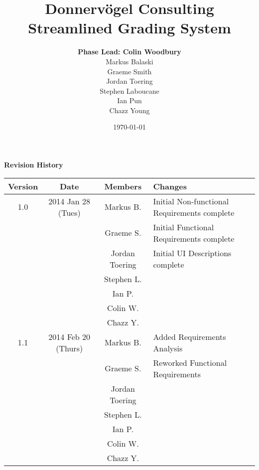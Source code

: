\documentclass{article}
\begin{document}
\title{Donnervögel Consulting \\ Streamlined Grading System}
\author{\textbf{Phase Lead: Colin Woodbury} \\ Markus Balaski \\ Graeme Smith \\ Jordan Toering 
			\\ Stephen Laboucane \\ Ian Pun \\ Chazz Young}
\date{\today}
\maketitle
\clearpage

\textbf{Revision History}
\begin{center}
  \begin{tabular}{| c | c | c | l |}
    \hline
    Version & Date & Members & Changes\\
    \hline
    1.0 & 2014 Jan 28 (Tues) & Markus B. & Initial Non-functional Requirements complete\\
    & & Graeme S. & Initial Functional Requirements complete\\
    & & Jordan Toering & Initial UI Descriptions complete\\
    & & Stephen L. & \\
    & & Ian P. & \\
    & & Colin W. & \\
    & & Chazz Y. & \\
    \hline
    1.1 & 2014 Feb 20 (Thurs) & Markus B. & Added Requirements Analysis\\
    & & Graeme S. & Reworked Functional Requirements\\
    & & Jordan Toering & \\
    & & Stephen L. & \\
    & & Ian P. & \\
    & & Colin W. & \\
    & & Chazz Y. & \\
    \hline
  \end{tabular}
\end{center}
\clearpage

\tableofcontents
\clearpage

\end{document}
